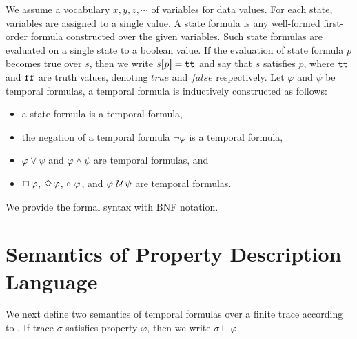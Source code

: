 \documentclass[12pt,a4paper,titlepage]{article}
\theoremstyle{break}
\begin{document}
We assume a vocabulary \(x,y,z,\cdots\) of variables for data values.
For each state, variables are assigned to a single value.
A state formula is any well-formed first-order formula constructed over the given variables.
Such state formulas are evaluated on a single state to a boolean value.
If the evaluation of state formula \(p\) becomes true over \(s\), then we write \(s\mbox{$[\hspace{-.8mm}{|}$} p\mbox{$|\hspace{-.8mm}{]}$}=\mbox{${\tt tt}$}\) and say that \(s\) satisfies \(p\), where $\mbox{${\tt tt}$}$ and $\mbox{${\tt ff}$}$ are truth values, denoting \(true\) and \(false\) respectively.
Let $\varphi$ and $\psi$ be temporal formulas, a temporal formula is inductively constructed as follows:
  \begin{itemize}
\item a state formula is a temporal formula,
\item the negation of a temporal formula \(\neg\varphi\) is a temporal formula,
\item \(\varphi\vee\psi\) and \(\varphi\wedge\psi\) are temporal formulas, and
\item \(\mbox{$\Box$}\,\varphi\), \(\mbox{$\Diamond$}\,\varphi\), \(\mbox{$\circ\,$}\,\varphi\), and \(\varphi\mbox{$\,\,{\cal U}\,$}\psi\) are temporal formulas.
  \end{itemize}

We provide the formal syntax with BNF notation.

\section{Semantics of Property Description Language}\label{sec:SemOfProp}
We next define two semantics of temporal formulas over a finite trace according to \cite{Eisner:2003}.
If trace \(\sigma\) satisfies property \(\varphi\), then we write \(\sigma\models\varphi\).
\end{document}
